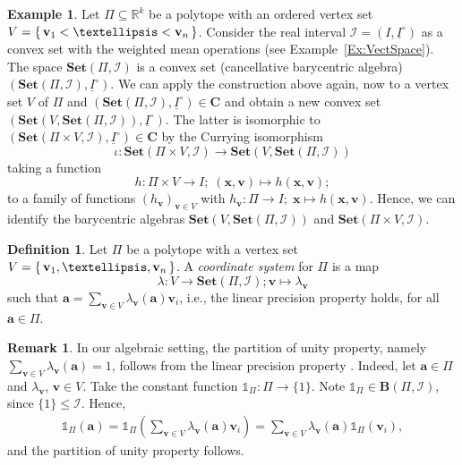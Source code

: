 \documentclass[12pt]{amsart}
\theoremstyle{plain}
\theoremstyle{definition}
\newtheorem{definition}[theorem]{Definition}
\newtheorem{remark}[theorem]{Remark}
\newtheorem{example}[theorem]{Example}
\numberwithin{equation}{section}
\begin{document}
\begin{example}\label{Ex:fspace}
Let $\Pi\subseteq \mathbb{R}^k$ be a polytope with an ordered vertex set $V=\set{\mathbf v_1<\dots<\mathbf v_n}$. Consider the real interval $\mathcal{I}=(I,\underline{I}^{\circ})$ as a convex set with the weighted mean operations (see Example~\ref{Ex:VectSpace}). The space $\mathbf{Set}(\Pi,\mathcal{I})$ is a convex set (cancellative barycentric algebra) $(\mathbf{Set}(\Pi,\mathcal{I}),\underline{I}^{\circ})$. We can apply the construction above again, now to a vertex set $V$ of $\Pi$ and $(\mathbf{Set}(\Pi,\mathcal{I}),\underline{I}^{\circ})\in \mathbf{C}$ and obtain a new convex set $(\mathbf{Set}(V,\mathbf{Set}(\Pi,\mathcal{I})),\underline{I}^{\circ})$. The latter is isomorphic to $(\mathbf{Set}(\Pi\times V,\mathcal{I}),\underline{I}^{\circ})\in\mathbf{C}$ by the Currying isomorphism 
$$
\iota\colon \mathbf{Set}(\Pi\times V,\mathcal{I})\rightarrow \mathbf{Set}(V,\mathbf{Set}(\Pi,\mathcal{I}))
$$
taking a function
$$
h\colon \Pi\times V\rightarrow I;\;(\mathbf x,\mathbf v)\mapsto h(\mathbf x,\mathbf v);
$$
to a family of functions $(h_{\mathbf v})_{\mathbf{v}\in V}$ with $h_\mathbf{v}\colon \Pi\rightarrow I;\;\mathbf{x}\mapsto h(\mathbf{x},\mathbf{v})$. Hence, we can identify the barycentric algebras $\mathbf{Set}(V,\mathbf{Set}(\Pi,\mathcal{I}))$ and $\mathbf{Set}(\Pi\times V,\mathcal{I})$.
\end{example}

\begin{definition}\cite[Definition 6.3]{RSZ1}
Let $\Pi$ be a polytope with a vertex set $V=\set{\mathbf v_1,\dots,\mathbf v_n}$.  A \emph{coordinate system} for $\Pi$ is a map
\begin{equation}
\lambda\colon V\to \mathbf{Set}(\Pi,\mathcal{I});\mathbf v\mapsto\lambda_{\mathbf v}
\end{equation}
such that $\mathbf{a}=\sum_{\mathbf{v}\in V}\lambda_{\mathbf{v}}(\mathbf{a})\mathbf{v}_i$, i.e., the linear precision property holds, for all $\mathbf{a}\in\Pi$.
\end{definition}

\begin{remark}
In our algebraic setting, the partition of unity property, namely $\sum_{\mathbf{v}\in V}\lambda_{\mathbf{v}}(\mathbf{a})=1$, follows from the linear precision property \cite[Lemma 2.23]{RSZ1}. Indeed, let $\mathbf{a}\in\Pi$ and $\lambda_{\mathbf{v}}$, $\mathbf{v}\in V$. Take the constant function $\mathds 1_\Pi\colon \Pi\to \{1\}$. Note $\mathds 1_\Pi\in\mathbf{B}(\Pi,\mathcal{I})$, since $\{1\}\leq \mathcal{I}$. Hence,
\begin{align*}
\mathds 1_\Pi(\mathbf{a})=\mathds 1_\Pi\left(\sum_{\mathbf{v}\in V}\lambda_{\mathbf{v}}(\mathbf{a})\mathbf{v}_i\right)=\sum_{\mathbf{v}\in V}\lambda_{\mathbf{v}}(\mathbf{a})\mathds 1_\Pi(\mathbf{v}_i),
\end{align*}
and the partition of unity property follows.
\end{remark}
\end{document}
